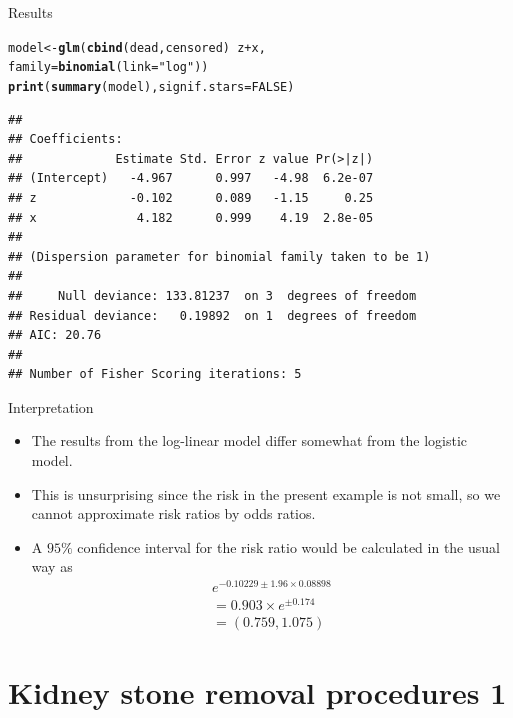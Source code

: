\documentclass[10pt]{beamer}\usepackage[]{graphicx}\usepackage[]{color}
\makeatletter
\newcommand{\hlnum}[1]{\textcolor[rgb]{0.686,0.059,0.569}{#1}}%
\newcommand{\hlstr}[1]{\textcolor[rgb]{0.192,0.494,0.8}{#1}}%
\newcommand{\hlopt}[1]{\textcolor[rgb]{0,0,0}{#1}}%
\newcommand{\hlstd}[1]{\textcolor[rgb]{0.345,0.345,0.345}{#1}}%
\newcommand{\hlkwb}[1]{\textcolor[rgb]{0.69,0.353,0.396}{#1}}%
\newcommand{\hlkwc}[1]{\textcolor[rgb]{0.333,0.667,0.333}{#1}}%
\newcommand{\hlkwd}[1]{\textcolor[rgb]{0.737,0.353,0.396}{\textbf{#1}}}%
\newenvironment{kframe}{%
 \def\at@end@of@kframe{}%
 \ifinner\ifhmode%
  \def\at@end@of@kframe{\end{minipage}}%
  \begin{minipage}{\columnwidth}%
 \fi\fi%
 \def\FrameCommand##1{\hskip\@totalleftmargin \hskip-\fboxsep
 \colorbox{shadecolor}{##1}\hskip-\fboxsep
     \hskip-\linewidth \hskip-\@totalleftmargin \hskip\columnwidth}%
 \MakeFramed {\advance\hsize-\width
   \@totalleftmargin\z@ \linewidth\hsize
   \@setminipage}}%
 {\par\unskip\endMakeFramed%
 \at@end@of@kframe}
\newenvironment{knitrout}{}{} %
\makeatother
\begin{document}
\begin{frame}[fragile]{Results}
\begin{knitrout}
\color{fgcolor}\begin{kframe}
\begin{alltt}
\hlstd{model} \hlkwb{<-} \hlkwd{glm}\hlstd{(}\hlkwd{cbind}\hlstd{(dead,censored)} \hlopt{~} \hlstd{z} \hlopt{+} \hlstd{x,}
             \hlkwc{family}\hlstd{=}\hlkwd{binomial}\hlstd{(}\hlkwc{link}\hlstd{=}\hlstr{"log"}\hlstd{))}
\hlkwd{print}\hlstd{(}\hlkwd{summary}\hlstd{(model),} \hlkwc{signif.stars} \hlstd{=} \hlnum{FALSE}\hlstd{)}
\end{alltt}
\begin{verbatim}
## 
## Coefficients:
##             Estimate Std. Error z value Pr(>|z|)
## (Intercept)   -4.967      0.997   -4.98  6.2e-07
## z             -0.102      0.089   -1.15     0.25
## x              4.182      0.999    4.19  2.8e-05
## 
## (Dispersion parameter for binomial family taken to be 1)
## 
##     Null deviance: 133.81237  on 3  degrees of freedom
## Residual deviance:   0.19892  on 1  degrees of freedom
## AIC: 20.76
## 
## Number of Fisher Scoring iterations: 5
\end{verbatim}
\end{kframe}
\end{knitrout}
\end{frame}



\begin{frame}[fragile]{Interpretation}
	\begin{itemize}
		\item The results from the log-linear model differ somewhat from the logistic model.
		\item This is unsurprising since the risk in the present example is not small, so we cannot approximate risk ratios by odds ratios.
		\item A $95 \%$ confidence interval for the risk ratio would be
		calculated in the usual way as
		$$
		\begin{array}{l}
		e^{-0.10229 \pm 1.96 \times 0.08898} \\
		=0.903 \times e^{\pm 0.174} \\
		=(0.759,1.075)
		\end{array}
		$$
	\end{itemize}
\end{frame}




\section{Kidney stone removal procedures 1}
\end{document}
